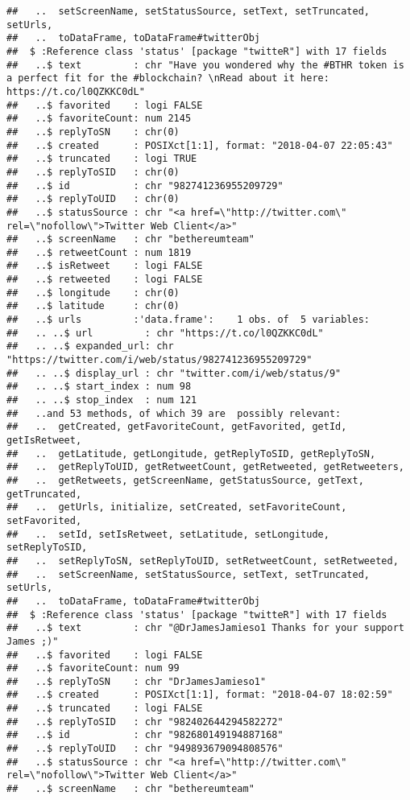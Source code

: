 \documentclass[]{article}
\begin{document}
\begin{verbatim}
##   ..  setScreenName, setStatusSource, setText, setTruncated, setUrls,
##   ..  toDataFrame, toDataFrame#twitterObj
##  $ :Reference class 'status' [package "twitteR"] with 17 fields
##   ..$ text         : chr "Have you wondered why the #BTHR token is a perfect fit for the #blockchain? \nRead about it here: https://t.co/l0QZKKC0dL"
##   ..$ favorited    : logi FALSE
##   ..$ favoriteCount: num 2145
##   ..$ replyToSN    : chr(0) 
##   ..$ created      : POSIXct[1:1], format: "2018-04-07 22:05:43"
##   ..$ truncated    : logi TRUE
##   ..$ replyToSID   : chr(0) 
##   ..$ id           : chr "982741236955209729"
##   ..$ replyToUID   : chr(0) 
##   ..$ statusSource : chr "<a href=\"http://twitter.com\" rel=\"nofollow\">Twitter Web Client</a>"
##   ..$ screenName   : chr "bethereumteam"
##   ..$ retweetCount : num 1819
##   ..$ isRetweet    : logi FALSE
##   ..$ retweeted    : logi FALSE
##   ..$ longitude    : chr(0) 
##   ..$ latitude     : chr(0) 
##   ..$ urls         :'data.frame':    1 obs. of  5 variables:
##   .. ..$ url         : chr "https://t.co/l0QZKKC0dL"
##   .. ..$ expanded_url: chr "https://twitter.com/i/web/status/982741236955209729"
##   .. ..$ display_url : chr "twitter.com/i/web/status/9"
##   .. ..$ start_index : num 98
##   .. ..$ stop_index  : num 121
##   ..and 53 methods, of which 39 are  possibly relevant:
##   ..  getCreated, getFavoriteCount, getFavorited, getId, getIsRetweet,
##   ..  getLatitude, getLongitude, getReplyToSID, getReplyToSN,
##   ..  getReplyToUID, getRetweetCount, getRetweeted, getRetweeters,
##   ..  getRetweets, getScreenName, getStatusSource, getText, getTruncated,
##   ..  getUrls, initialize, setCreated, setFavoriteCount, setFavorited,
##   ..  setId, setIsRetweet, setLatitude, setLongitude, setReplyToSID,
##   ..  setReplyToSN, setReplyToUID, setRetweetCount, setRetweeted,
##   ..  setScreenName, setStatusSource, setText, setTruncated, setUrls,
##   ..  toDataFrame, toDataFrame#twitterObj
##  $ :Reference class 'status' [package "twitteR"] with 17 fields
##   ..$ text         : chr "@DrJamesJamieso1 Thanks for your support James ;)"
##   ..$ favorited    : logi FALSE
##   ..$ favoriteCount: num 99
##   ..$ replyToSN    : chr "DrJamesJamieso1"
##   ..$ created      : POSIXct[1:1], format: "2018-04-07 18:02:59"
##   ..$ truncated    : logi FALSE
##   ..$ replyToSID   : chr "982402644294582272"
##   ..$ id           : chr "982680149194887168"
##   ..$ replyToUID   : chr "949893679094808576"
##   ..$ statusSource : chr "<a href=\"http://twitter.com\" rel=\"nofollow\">Twitter Web Client</a>"
##   ..$ screenName   : chr "bethereumteam"

\end{verbatim}
\end{document}
